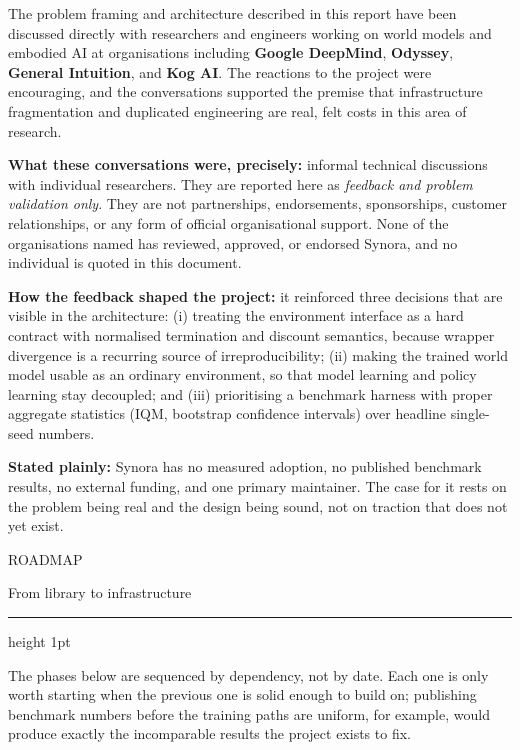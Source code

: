\documentclass[10pt,a4paper]{article}
\newcommand{\kicker}[1]{{\footnotesize\displayfont\color{accent}\MakeUppercase{#1}}}
\newcommand{\pagetitle}[2]{%
  \kicker{#1}\par\vspace{1.5mm}
  {\Huge\displayfont\color{ink} #2}\par\vspace{2.5mm}
  {\color{rule}\hrule height 1pt}\par\vspace{4mm}}
\begin{document}
\begin{callout}
{\footnotesize
The problem framing and architecture described in this report have been discussed directly with
researchers and engineers working on world models and embodied AI at organisations including
\textbf{Google DeepMind}, \textbf{Odyssey}, \textbf{General Intuition}, and \textbf{Kog AI}. The
reactions to the project were encouraging, and the conversations supported the premise that
infrastructure fragmentation and duplicated engineering are real, felt costs in this area of
research.
\vspace{2mm}

\textbf{What these conversations were, precisely:} informal technical discussions with individual
researchers. They are reported here as \emph{feedback and problem validation only}. They are not
partnerships, endorsements, sponsorships, customer relationships, or any form of official
organisational support. None of the organisations named has reviewed, approved, or endorsed
Synora, and no individual is quoted in this document.
\vspace{2mm}

\textbf{How the feedback shaped the project:} it reinforced three decisions that are visible in the
architecture: (i) treating the environment interface as a hard contract with normalised
termination and discount semantics, because wrapper divergence is a recurring source of
irreproducibility; (ii) making the trained world model usable as an ordinary environment, so that
model learning and policy learning stay decoupled; and (iii) prioritising a benchmark harness with
proper aggregate statistics (IQM, bootstrap confidence intervals) over headline single-seed
numbers.}
\end{callout}

\vspace{3mm}
\begin{warncallout}
{\footnotesize\textbf{Stated plainly:} Synora has no measured adoption, no published benchmark
results, no external funding, and one primary maintainer. The case for it rests on the problem
being real and the design being sound, not on traction that does not yet exist.}
\end{warncallout}

\newpage
\pagetitle{Roadmap}{From library to infrastructure}

{\footnotesize
The phases below are sequenced by dependency, not by date. Each one is only worth starting when the
previous one is solid enough to build on; publishing benchmark numbers before the training paths are
uniform, for example, would produce exactly the incomparable results the project exists to fix.}
\end{document}
